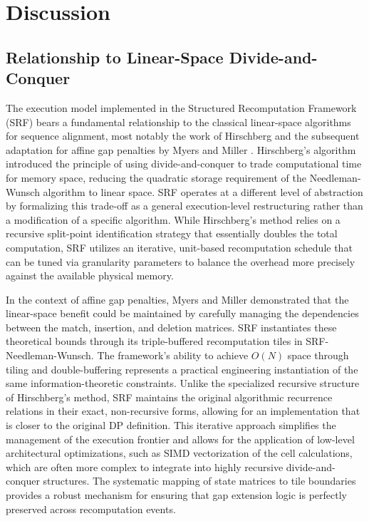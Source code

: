 \section{Discussion}

\subsection{Relationship to Linear-Space Divide-and-Conquer}

The execution model implemented in the Structured Recomputation Framework (SRF) bears a fundamental relationship to the classical linear-space algorithms for sequence alignment, most notably the work of Hirschberg \cite{Hirschberg1975} and the subsequent adaptation for affine gap penalties by Myers and Miller \cite{Myers1988}. Hirschberg's algorithm introduced the principle of using divide-and-conquer to trade computational time for memory space, reducing the quadratic storage requirement of the Needleman-Wunsch algorithm to linear space. SRF operates at a different level of abstraction by formalizing this trade-off as a general execution-level restructuring rather than a modification of a specific algorithm. While Hirschberg's method relies on a recursive split-point identification strategy that essentially doubles the total computation, SRF utilizes an iterative, unit-based recomputation schedule that can be tuned via granularity parameters to balance the overhead more precisely against the available physical memory.

In the context of affine gap penalties, Myers and Miller demonstrated that the linear-space benefit could be maintained by carefully managing the dependencies between the match, insertion, and deletion matrices. SRF instantiates these theoretical bounds through its triple-buffered recomputation tiles in SRF-Needleman-Wunsch. The framework's ability to achieve $O(N)$ space through tiling and double-buffering represents a practical engineering instantiation of the same information-theoretic constraints. Unlike the specialized recursive structure of Hirschberg's method, SRF maintains the original algorithmic recurrence relations in their exact, non-recursive forms, allowing for an implementation that is closer to the original DP definition. This iterative approach simplifies the management of the execution frontier and allows for the application of low-level architectural optimizations, such as SIMD vectorization of the cell calculations, which are often more complex to integrate into highly recursive divide-and-conquer structures. The systematic mapping of state matrices to tile boundaries provides a robust mechanism for ensuring that gap extension logic is perfectly preserved across recomputation events.

